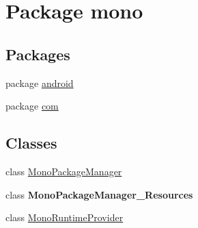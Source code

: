 \hypertarget{namespacemono}{\section{Package mono}
\label{namespacemono}
}
\subsection*{Packages}
\begin{DoxyCompactItemize}
\item 
package \hyperlink{namespacemono_1_1android}{android}
\item 
package \hyperlink{namespacemono_1_1com}{com}
\end{DoxyCompactItemize}
\subsection*{Classes}
\begin{DoxyCompactItemize}
\item 
class \hyperlink{classmono_1_1_mono_package_manager}{Mono\+Package\+Manager}
\item 
class {\bfseries Mono\+Package\+Manager\+\_\+\+Resources}
\item 
class \hyperlink{classmono_1_1_mono_runtime_provider}{Mono\+Runtime\+Provider}
\end{DoxyCompactItemize}
